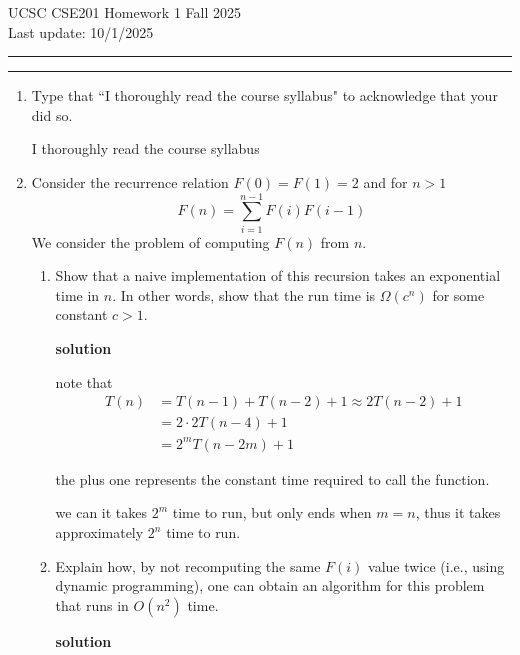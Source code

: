 \documentclass[letterpaper,12pt]{article}
\begin{document}
\noindent
 UCSC CSE201 Homework 1 \hfill Fall 2025 \\
Last update: 10/1/2025 \\
 \rule{\textwidth}{0.5pt}

% 

\enlargethispage*{1.5cm}

\noindent
 \rule{\textwidth}{0.5pt}




\begin{enumerate}

\item Type that ``I thoroughly read the course syllabus" to acknowledge that your did so. 

I thoroughly read the course syllabus


\item
Consider the recurrence relation
$F(0)=F(1)=2$ and for $n>1$
$$F(n)= \sum_{i=1}^{n-1} F(i) F(i-1)$$
We consider the problem of computing $F(n)$ from $n$.

\begin{enumerate}


\item
Show that a naive implementation of this recursion takes an exponential time in $n$. In other words,
show that the run time is $\Omega(c^n)$ for some constant $c  > 1$.

\textbf{solution}

note that \begin{equation}\begin{split}
        T(n) &= T(n-1) + T(n-2) +1\approx 2T(n-2)+1\\
        &= 2\cdot 2 T(n-4)+1\\
        &= 2^m T(n-2m)+1
\end{split}
\end{equation}

the plus one represents the constant time required to  call the function.

we can it takes \(2^m\) time to run, but only ends when \(m=n\), thus it takes approximately \(2^n\) time to run.







\item Explain how, by not recomputing the same $F(i)$ value twice (i.e., using dynamic programming),
one can obtain an algorithm for this problem that runs in $O(n^2)$ 
time. 

\textbf{solution}





\end{enumerate}
\end{enumerate}
\end{document}

